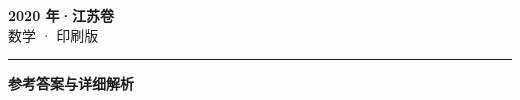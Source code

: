 \documentclass[zihao=5, a4paper]{ctexart}
\begin{document}
\begin{center}
  {\Large\bfseries 2020 年·江苏卷}\\[4pt]
  {\large 数学 · 印刷版}
\end{center}
\medskip
{}

\par\bigskip\hrule\bigskip
{}
\Needspace{0.55\textheight}
\begin{center}{\large\bfseries 参考答案与详细解析}\end{center}
\smallskip

\end{document}
